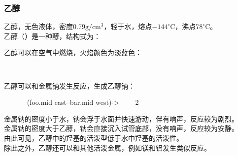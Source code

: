 \documentclass[UTF8]{ctexart}
\begin{document}
\subsubsection{乙醇}
    乙醇，无色液体，密度$0.79\text{g}/\text{cm}^3$，轻于水，熔点$-144^\circ$C，沸点$78^\circ$C。\\[3mm]
    乙醇（）是一种醇，结构式为：
    \begin{center}
    \end{center}\vspace{10pt}
    乙醇可以在空气中燃烧，火焰颜色为淡蓝色：
    \begin{center}
        \\[8mm]
    \end{center}
    乙醇可以和金属钠发生反应，生成乙醇钠：\vspace{10pt}
    \begin{center}

        ~~
            \+{12pt,10pt,1pt}
            ~~~~\arrow(foo.mid east--bar.mid west){->}~~~~
            2~~
            \+{12pt,10pt,1pt}
        \schemestop
    \end{center}\vspace{15pt}
    金属钠的密度小于水，钠会浮于水面并快速游动，伴有响声，反应较为剧烈。\\[3mm]
    金属钠的密度大于乙醇，钠会直接沉入试管底部，没有响声，反应较为安静。\\[3mm]
    由此可见，乙醇中的羟基的活泼型低于水中羟基的活泼性。\\[3mm]
    除此之外，乙醇还可以和其他活泼金属，例如镁和铝发生类似反应。

\newpage
\end{document}
